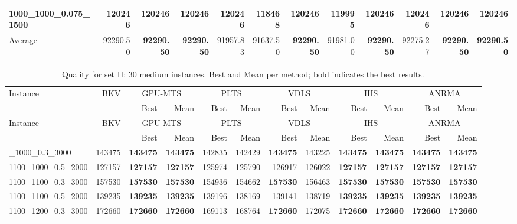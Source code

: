\begin{landscape}
\begin{longtable}{lrrrrrrrrrrr}
1000\_1000\_0.075\_1500 & 120246 & \textbf{120246} & \textbf{120246} & \textbf{120246} & 118468 & \textbf{120246} & 119995 & \textbf{120246} & \textbf{120246} & \textbf{120246} & \textbf{120246}\\
\midrule
Average & 92290.50 & \textbf{92290.50} & \textbf{92290.50} & 91957.83 & 91637.50 & \textbf{92290.50} & 91981.00 & \textbf{92290.50} & 92275.27 & \textbf{92290.50} & \textbf{92290.50}\\
\end{longtable}\endgroup\clearpage
\begingroup\fontsize{9}{10.5}\selectfont\setlength{\tabcolsep}{2.5pt}\renewcommand{\arraystretch}{.88}
\begin{longtable}{lrrrrrrrrrrr}
\caption{{Quality for set II: 30 medium instances. Best and Mean per method; bold indicates the best results.}}\label{tab:full-c2}\\
\toprule
Instance & BKV & \multicolumn{2}{c}{GPU-MTS} & \multicolumn{2}{c}{PLTS} & \multicolumn{2}{c}{VDLS} & \multicolumn{2}{c}{IHS} & \multicolumn{2}{c}{ANRMA}\\
 &  & Best & Mean & Best & Mean & Best & Mean & Best & Mean & Best & Mean\\
\midrule\endfirsthead
Instance & BKV & \multicolumn{2}{c}{GPU-MTS} & \multicolumn{2}{c}{PLTS} & \multicolumn{2}{c}{VDLS} & \multicolumn{2}{c}{IHS} & \multicolumn{2}{c}{ANRMA}\\
 &  & Best & Mean & Best & Mean & Best & Mean & Best & Mean & Best & Mean\\
\midrule\endhead
\bottomrule\endlastfoot
1100\_1000\_0.3\_3000 & 143475 & \textbf{143475} & \textbf{143475} & 142835 & 142429 & \textbf{143475} & 143225 & \textbf{143475} & \textbf{143475} & \textbf{143475} & \textbf{143475}\\
1100\_1000\_0.5\_2000 & 127157 & \textbf{127157} & \textbf{127157} & 125974 & 125790 & 126917 & 126022 & \textbf{127157} & \textbf{127157} & \textbf{127157} & \textbf{127157}\\
1100\_1100\_0.3\_3000 & 157530 & \textbf{157530} & \textbf{157530} & 154936 & 154662 & \textbf{157530} & 156463 & \textbf{157530} & \textbf{157530} & \textbf{157530} & \textbf{157530}\\
1100\_1100\_0.5\_2000 & 139235 & \textbf{139235} & \textbf{139235} & 139196 & 138169 & 139141 & 138719 & \textbf{139235} & \textbf{139235} & \textbf{139235} & \textbf{139235}\\
1100\_1200\_0.3\_3000 & 172660 & \textbf{172660} & \textbf{172660} & 169113 & 168764 & \textbf{172660} & 172075 & \textbf{172660} & \textbf{172660} & \textbf{172660} & \textbf{172660}\\

\end{longtable}
\end{landscape}
